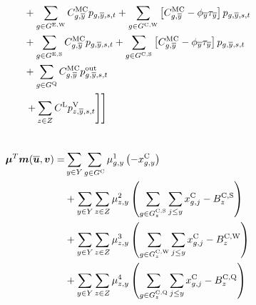 \documentclass{article}
\begin{document}
\begin{alignat}{3}
	& && && + \sum\limits_{\iGenerator \in \sGeneratorsExistingWind} \cMarginalCost[\iGenerator,\iYearTerminal] \vPower[\iGenerator,\iYearTerminal,\iScenario,\iInterval] + \sum\limits_{\iGenerator \in \sGeneratorsCandidateWind} \left[\cMarginalCost[\iGenerator,\iYearTerminal] - \vBaseline[\iYearTerminal] \vPermitPrice[\iYearTerminal]\right] \vPower[\iGenerator,\iYearTerminal,\iScenario,\iInterval] \nonumber\\
	& && && + \sum\limits_{\iGenerator \in \sGeneratorsExistingSolar} \cMarginalCost[\iGenerator,\iYearTerminal] \vPower[\iGenerator,\iYearTerminal,\iScenario,\iInterval] + \sum\limits_{\iGenerator \in \sGeneratorsCandidateSolar} \left[\cMarginalCost[\iGenerator,\iYearTerminal] - \vBaseline[\iYearTerminal]\vPermitPrice[\iYearTerminal]\right] \vPower[\iGenerator,\iYearTerminal,\iScenario,\iInterval]\nonumber\\
	& && && + \sum\limits_{\iGenerator \in \sStorage} \cMarginalCost[\iGenerator,\iYearTerminal] \vPowerOut[\iGenerator,\iYearTerminal,\iScenario,\iInterval] \nonumber\\
	& && && \left.\left. + \sum\limits_{\iZone \in \sZones} \cLostLoadCost \vLostLoadPower[\iZone,\iYearTerminal,\iScenario,\iInterval] \right]\right] \\\nonumber
\end{alignat}

\begin{align}
\bm{\mu}^{T}\bm{m}(\bm{\overline{u}}, \bm{v}) = & \sum\limits_{\iYear \in \sYears} \sum\limits_{\iGenerator \in \sGeneratorsCandidate} \dNonNegativeCandidateCapacity \left(-\vInstalledCapacity\right)\nonumber\\
& + \sum\limits_{\iYear \in \sYears}\sum\limits_{\iZone \in \sZones} \dSolarBuildLimit \left(\sum\limits_{\iGenerator \in \sGeneratorsCandidateSolar_{\iZone}} \sum\limits_{\iYearAlias \leq \iYear} \vInstalledCapacity[\iGenerator,\iYearAlias]  - \cBuildLimitSolar\right)\nonumber\\
& + \sum\limits_{\iYear \in \sYears}\sum\limits_{\iZone \in \sZones} \dWindBuildLimit \left(\sum\limits_{\iGenerator \in \sGeneratorsCandidateWind_{\iZone}} \sum\limits_{\iYearAlias \leq \iYear} \vInstalledCapacity[\iGenerator,\iYearAlias] - \cBuildLimitWind\right)\nonumber\\
& + \sum\limits_{\iYear \in \sYears}\sum\limits_{\iZone \in \sZones} \dStorageBuildLimit \left(\sum\limits_{\iGenerator \in \sStorageCandidate_{\iZone}} \sum\limits_{\iYearAlias \leq \iYear} \vInstalledCapacity[\iGenerator,\iYearAlias] - \cBuildLimitStorage\right)\\\nonumber
\end{align}
\end{document}
